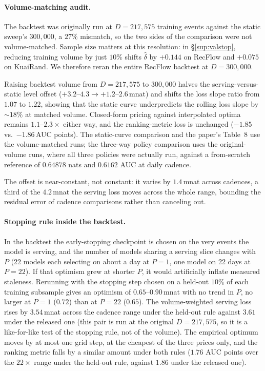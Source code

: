 \documentclass[10pt,letterpaper]{article}
\begin{document}
\paragraph{Volume-matching audit.}
The backtest was originally run at $D = 217{,}575$ training events against
the static sweep's $300{,}000$, a $27\%$ mismatch, so the two sides of the
comparison were not volume-matched. Sample size matters at this resolution: in
\S\ref{sup:valstop}, reducing training volume by just $10\%$ shifts $\hat\delta$
by $+0.144$ on RecFlow and $+0.075$ on KuaiRand. We therefore reran the entire
RecFlow backtest at $D = 300{,}000$.

Raising backtest volume from $D = 217{,}575$ to $300{,}000$ halves the
serving-versus-static level offset ($+3.2\text{--}4.3 \to +1.2\text{--}2.6$\,mnat)
and shifts the loss slope ratio from $1.07$ to $1.22$, showing that the static
curve underpredicts the rolling loss slope by ${\sim}18\%$ at matched volume.
Closed-form pricing against interpolated optima remains $1.1$--$2.3\times$
either way, and the ranking-metric loss is unchanged ($-1.85$ vs.\ $-1.86$\,AUC
points). The static-curve comparison and the paper's Table~8 use the
volume-matched runs; the three-way policy comparison uses the original-volume
runs, where all three policies were actually run, against a from-scratch
reference of $0.64878$ nats and $0.6162$ AUC at daily cadence.

The offset is near-constant, not constant: it varies by $1.4$\,mnat across
cadences, a third of the $4.2$\,mnat the serving loss moves across the whole
range, bounding the residual error of cadence comparisons rather than canceling
out.

\paragraph{Stopping rule inside the backtest.}
In the backtest the early-stopping checkpoint is chosen on the very events
the model is serving, and the number of models sharing a serving slice
changes with $P$ (22 models each selecting on about a day at $P = 1$, one
model on 22 days at $P = 22$). If that optimism grew at shorter $P$, it would
artificially inflate measured staleness. Rerunning with the stopping step
chosen on a held-out $10\%$ of each training subsample gives an optimism of
$0.65$--$0.90$\,mnat with no trend in $P$, no larger at $P = 1$ ($0.72$) than
at $P = 22$ ($0.65$). The volume-weighted serving loss rises by $3.54$\,mnat
across the cadence range under the held-out rule against $3.61$ under the
released one (this pair is run at the original $D = 217{,}575$, so it is a
like-for-like test of the stopping rule, not of the volume). The empirical
optimum moves by at most one grid step, at the cheapest of the three prices
only, and the ranking metric falls by a similar amount under both rules ($1.76$
AUC points over the $22\times$ range under the held-out rule, against $1.86$
under the released one).
\end{document}
